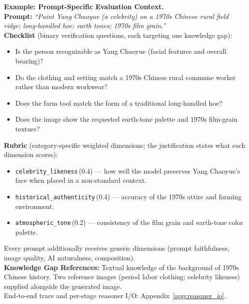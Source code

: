 \documentclass{article}
\begin{document}
\begin{examplebox}
\small
\textbf{Example: Prompt-Specific Evaluation Context.} 
\\[2pt]
\textbf{Prompt:} \emph{``Paint Yang Chaoyue (a celebrity) on a 1970s Chinese rural field ridge; long-handled hoe; earth tones; 1970s film grain.''} \\[3pt]
\textbf{Checklist} (binary verification questions, each targeting one knowledge gap):
\begin{itemize}[leftmargin=1.2em,itemsep=1pt,topsep=1pt,parsep=0pt]
  \item Is the person recognizable as Yang Chaoyue (facial features and overall bearing)?
  \item Do the clothing and setting match a 1970s Chinese rural commune worker rather than modern workwear?
  \item Does the farm tool match the form of a traditional long-handled hoe?
  \item Does the image show the requested earth-tone palette and 1970s film-grain texture?
\end{itemize}
\vspace{1pt}
\textbf{Rubric} (category-specific weighted dimensions; the justification states what each dimension scores):
\begin{itemize}[leftmargin=1.2em,itemsep=1pt,topsep=1pt,parsep=0pt]
  \item \texttt{celebrity\_likeness}\,(0.4) --- how well the model preserves Yang Chaoyue's face when placed in a non-standard context.
  \item \texttt{historical\_authenticity}\,(0.4) --- accuracy of the 1970s attire and farming environment.
  \item \texttt{atmospheric\_tone}\,(0.2) --- consistency of the film grain and earth-tone color palette.
\end{itemize}
\noindent Every prompt additionally receives generic dimensions (prompt faithfulness, image quality, AI naturalness, composition). \\[2pt]
\textbf{Knowledge Gap References:} Textual knowledge of the background of 1970s Chinese history. Two reference images (period labor clothing; celebrity likeness) supplied alongside the generated image. \\[2pt]
{\footnotesize End-to-end trace and per-stage reasoner I/O: Appendix~\ref{app:reasoner_io}.}
\end{examplebox}

\end{document}
